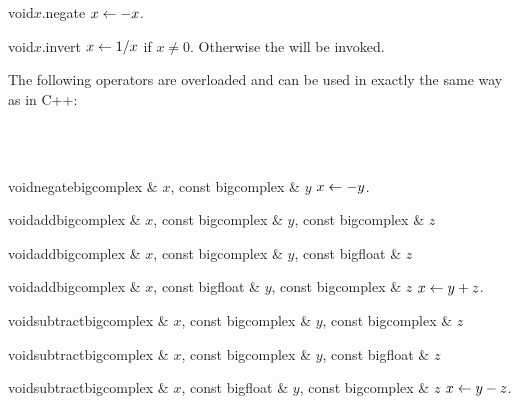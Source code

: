 
\MODF

\begin{fcode}{void}{$x$.negate}{}
  $x \leftarrow -x$.
\end{fcode}

\begin{fcode}{void}{$x$.invert}{}
  $x \leftarrow 1 / x$ if $x \neq 0$.  Otherwise the \LEH will be invoked.
\end{fcode}



\ARTH

The following operators are overloaded and can be used in exactly the same way as in C++:

\begin{center}
  \\
  \\
\end{center}

\begin{fcode}{void}{negate}{bigcomplex & $x$, const bigcomplex & $y$}
  $x \leftarrow -y$.
\end{fcode}

\begin{fcode}{void}{add}{bigcomplex & $x$, const bigcomplex & $y$, const bigcomplex & $z$}\end{fcode}
\begin{fcode}{void}{add}{bigcomplex & $x$, const bigcomplex & $y$, const bigfloat & $z$}\end{fcode}
\begin{fcode}{void}{add}{bigcomplex & $x$, const bigfloat & $y$, const bigcomplex & $z$}
  $x \leftarrow y + z$.
\end{fcode}

\begin{fcode}{void}{subtract}{bigcomplex & $x$, const bigcomplex & $y$, const bigcomplex & $z$}\end{fcode}
\begin{fcode}{void}{subtract}{bigcomplex & $x$, const bigcomplex & $y$, const bigfloat & $z$}\end{fcode}
\begin{fcode}{void}{subtract}{bigcomplex & $x$, const bigfloat & $y$, const bigcomplex & $z$}
  $x \leftarrow y - z$.
\end{fcode}

